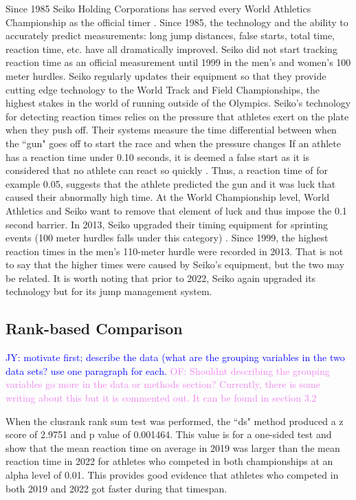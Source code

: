 \documentclass[12pt, letterpaper, titlepage]{article}
\newcommand{\jy}[1]{\textcolor{blue}{JY: #1}}
\newcommand{\of}[1]{\textcolor{violet}{OF: #1}}
\begin{document}
Since 1985 Seiko Holding Corporations has served every World Athletics Championship
as the official timer \citep{wa2022seiko}.  Since 1985, the technology and the ability
to accurately predict measurements: long jump distances, false starts, total time,
reaction time, etc. have all dramatically improved.  Seiko did not start tracking
reaction time as an official measurement until 1999 in the men's and women's 100 meter
hurdles.  Seiko regularly updates their equipment so that they provide cutting edge
technology to the World Track and Field Championships, the highest stakes in the world
of running outside of the Olympics. Seiko's technology for detecting reaction 
times relies on the pressure that athletes
exert on the plate when they push off.  Their systems measure the time differential
between when the ``gun" goes off to start the race and when the pressure changes 
\citep{wa2022seiko}  If an athlete has a reaction time under 0.10 seconds, it is deemed a 
false start as it is considered that no athlete can react so quickly 
\citep{Seiko-Timing}.  Thus, a reaction time of for example 0.05, suggests that 
the athlete predicted the gun and it was luck that caused their abnormally high 
time.  At the World Championship level, World Athletics and Seiko want to remove 
that element of luck and thus impose the 0.1 second barrier. In 2013, Seiko 
upgraded their timing equipment for sprinting events (100 meter hurdles falls 
under this category) \citep{wa2013backtage}.  Since 1999, the highest reaction 
times in the men's 110-meter hurdle were recorded in 2013.  That is not to say that the higher 
times were caused by Seiko's equipment, but the two may be related.  It is worth noting that prior
to 2022, Seiko again upgraded its technology but for its jump management system.


\subsection{Rank-based Comparison} \label{subsec:Results_Rank}


\jy{motivate first; describe the data (what are the grouping variables in the
  two data sets? use one paragraph for each.}
\of{Shouldnt describing the grouping variables go more in the data or methods 
section?  Currently, there is some writing about this but it is commented out. It
can be found in section 3.2}



When the clusrank rank sum test was performed, the ``ds" method produced a z score of
2.9751 and p value of 0.001464.  This value is for a one-sided test and show that
the mean reaction time on average in 2019 was larger than the mean reaction time
in 2022 for athletes who competed in both championships at an alpha level of 0.01.
This provides good evidence that athletes who competed in both 2019 and 2022 got
faster during that timespan.
\end{document}
